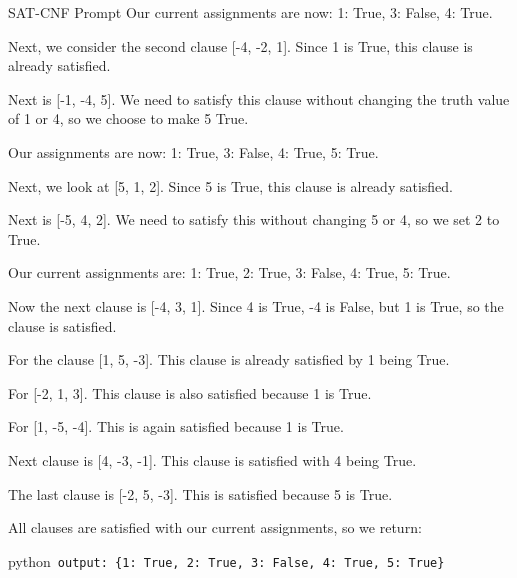 \documentclass{article} %
\begin{document}
\begin{mybox}[label=table: sat-cnf example]{SAT-CNF Prompt}
Our current assignments are now: {1: True, 3: False, 4: True}.\newline

Next, we consider the second clause [-4, -2, 1]. Since 1 is True, this clause is already satisfied.\newline

Next is [-1, -4, 5]. We need to satisfy this clause without changing the truth value of 1 or 4, so we choose to make 5 True.\newline

Our assignments are now: {1: True, 3: False, 4: True, 5: True}.\newline

Next, we look at [5, 1, 2]. Since 5 is True, this clause is already satisfied.\newline

Next is [-5, 4, 2]. We need to satisfy this without changing 5 or 4, so we set 2 to True.\newline

Our current assignments are: {1: True, 2: True, 3: False, 4: True, 5: True}.\newline

Now the next clause is [-4, 3, 1]. Since 4 is True, -4 is False, but 1 is True, so the clause is satisfied.\newline

For the clause [1, 5, -3]. This clause is already satisfied by 1 being True.\newline

For [-2, 1, 3]. This clause is also satisfied because 1 is True.\newline

For [1, -5, -4]. This is again satisfied because 1 is True.\newline

Next clause is [4, -3, -1]. This clause is satisfied with 4 being True.\newline

The last clause is [-2, 5, -3]. This is satisfied because 5 is True.\newline

All clauses are satisfied with our current assignments, so we return:\newline

\texttt{\textasciigrave{}\textasciigrave{}\textasciigrave{}}python\newline\
\texttt{output: \{1: True, 2: True, 3: False, 4: True, 5: True\}}
\newline\
\texttt{\textasciigrave{}\textasciigrave{}\textasciigrave{}}
\end{mybox}
\end{document}
